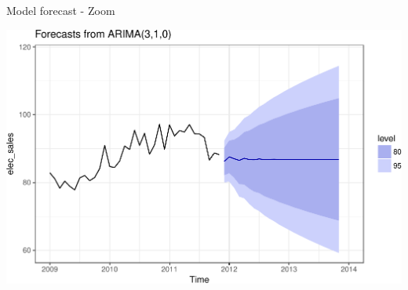 \documentclass[11pt,ignorenonframetext,]{beamer}
\newenvironment{Shaded}{}{}
\newcommand{\DataTypeTok}[1]{\textcolor[rgb]{0.56,0.13,0.00}{#1}}
\newcommand{\DecValTok}[1]{\textcolor[rgb]{0.25,0.63,0.44}{#1}}
\newcommand{\KeywordTok}[1]{\textcolor[rgb]{0.00,0.44,0.13}{\textbf{#1}}}
\newcommand{\NormalTok}[1]{#1}
\newcommand{\OperatorTok}[1]{\textcolor[rgb]{0.40,0.40,0.40}{#1}}
\newcommand{\StringTok}[1]{\textcolor[rgb]{0.25,0.44,0.63}{#1}}
\let\oldShaded\Shaded
\let\endoldShaded\endShaded
\renewenvironment{Shaded}{\footnotesize\begin{spacing}{0.9}\oldShaded}{\endoldShaded\end{spacing}}
\begin{document}
\begin{frame}[fragile]{%
\protect\hypertarget{model-forecast---zoom}{%
Model forecast - Zoom}}

\begin{Shaded}
\end{Shaded}

\begin{center}\includegraphics[width=\textwidth]{Lec09_files/figure-beamer/unnamed-chunk-32-1} \end{center}

\end{frame}
\end{document}
